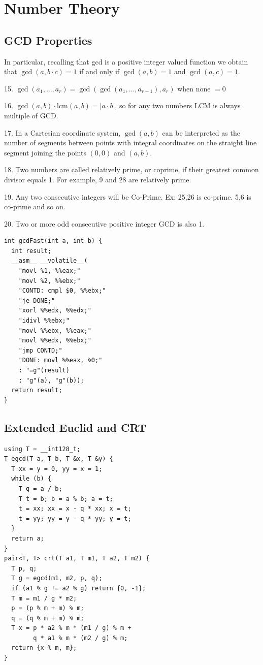 \section{Number Theory}
\subsection{GCD Properties}
In particular, recalling that gcd is a positive integer valued function we obtain that $\gcd(a, b \cdot c) = 1$ if and only if $\gcd(a, b) = 1$ and $\gcd(a, c) = 1$.

15. $\gcd(a_1, \ldots, a_r) = \gcd(\gcd(a_1, \ldots, a_{r-1}), a_r)$ when none $=0$

16. $\gcd(a,b) \cdot \text{lcm}(a,b) = |a \cdot b|$, so for any two numbers LCM is always multiple of GCD.

17. In a Cartesian coordinate system, $\gcd(a, b)$ can be interpreted as the number of segments between points with integral coordinates on the straight line segment joining the points $(0, 0)$ and $(a, b)$.

18. Two numbers are called relatively prime, or coprime, if their greatest common divisor equals 1. For example, 9 and 28 are relatively prime.

19. Any two consecutive integers will be Co-Prime. Ex: 25,26 is co-prime. 5,6 is co-prime and so on.

20. Two or more odd consecutive positive integer GCD is also 1.
\begin{verbatim}
int gcdFast(int a, int b) {
  int result;
  __asm__ __volatile__(
    "movl %1, %%eax;"
    "movl %2, %%ebx;"
    "CONTD: cmpl $0, %%ebx;"
    "je DONE;"
    "xorl %%edx, %%edx;"
    "idivl %%ebx;"
    "movl %%ebx, %%eax;"
    "movl %%edx, %%ebx;"
    "jmp CONTD;"
    "DONE: movl %%eax, %0;"
    : "=g"(result)
    : "g"(a), "g"(b));
  return result;
}
\end{verbatim}
\subsection{Extended Euclid and CRT}
\begin{verbatim}
using T = __int128_t;
T egcd(T a, T b, T &x, T &y) {
  T xx = y = 0, yy = x = 1;
  while (b) {
    T q = a / b;
    T t = b; b = a % b; a = t;
    t = xx; xx = x - q * xx; x = t;
    t = yy; yy = y - q * yy; y = t;
  }
  return a;
}
pair<T, T> crt(T a1, T m1, T a2, T m2) {
  T p, q;
  T g = egcd(m1, m2, p, q);
  if (a1 % g != a2 % g) return {0, -1};
  T m = m1 / g * m2;
  p = (p % m + m) % m;
  q = (q % m + m) % m;
  T x = p * a2 % m * (m1 / g) % m +
        q * a1 % m * (m2 / g) % m;
  return {x % m, m};
}
\end{verbatim}
